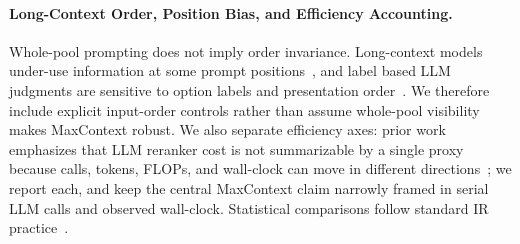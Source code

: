 \paragraph{Long-Context Order, Position Bias, and Efficiency Accounting.}
Whole-pool prompting does not imply order invariance. Long-context models under-use information at some prompt positions~\citep{liu2024lostmiddle,tang2024foundmiddle}, and label based LLM judgments are sensitive to option labels and presentation order~\citep{zheng2024mcqbias,shi2025positionbias,pradeep2023rankzephyr}. We therefore include explicit input-order controls rather than assume whole-pool visibility makes MaxContext robust. We also separate efficiency axes: prior work emphasizes that LLM reranker cost is not summarizable by a single proxy because calls, tokens, FLOPs, and wall-clock can move in different directions~\citep{zhuang2024setwise,podolak2025setwiseinsertion,peng2025flopsreranking}; we report each, and keep the central MaxContext claim narrowly framed in serial LLM calls and observed wall-clock. Statistical comparisons follow standard IR practice~\citep{smucker2007comparison,urbano2019significance}.
